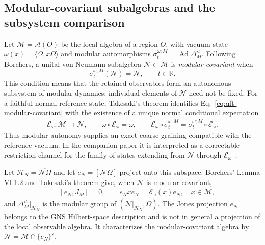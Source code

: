 \documentclass[a4paper,11pt]{article}
\theoremstyle{definition}
\begin{document}
\subsection{Modular-covariant subalgebras and the subsystem comparison}
\label{subsec:qft-modular-covariant}
Let $\mathcal M=\mathcal A(O)$ be the local algebra of a region $O$,
with vacuum state $\omega(x)=\langle\Omega,x\Omega\rangle$ and modular
automorphisms $\sigma_t^{\omega;M}=\operatorname{Ad}\Delta_M^{it}$.
Following Borchers, a unital von Neumann subalgebra
$\mathcal N\subset\mathcal M$ is \emph{modular covariant} when
\begin{equation}
 \sigma_t^{\omega;M}(\mathcal N)=\mathcal N,
 \qquad t\in\mathbb R .
 \label{eq:qft-modular-covariant}
\end{equation}
This condition means that the retained observables form an autonomous
subsystem of modular dynamics; individual elements of $\mathcal N$ need
not be fixed. For a faithful normal reference state, Takesaki's theorem
identifies Eq.~\eqref{eq:qft-modular-covariant} with the existence of a
unique normal conditional expectation
\begin{align}
 \mathcal E_\omega:\mathcal M\longrightarrow\mathcal N,
 \qquad \omega\circ\mathcal E_\omega=\omega,
 \qquad
 \mathcal E_\omega\circ\sigma_t^{\omega;M}
   =\sigma_t^{\omega;M}\circ\mathcal E_\omega .
 \label{eq:qft-Takesaki-expectation}
\end{align}
Thus modular autonomy supplies an exact coarse-graining compatible
with the reference vacuum. In the companion paper it is interpreted as
a correctable restriction channel for the family of states extending
from $\mathcal N$ through $\mathcal E_\omega$~\cite{companion}.

Let $\mathcal H_N=\overline{\mathcal N\Omega}$ and let
$e_N=[\mathcal N\Omega]$ project onto this subspace. Borchers'
Lemma VI.1.2 and Takesaki's theorem give, when $\mathcal N$ is modular
covariant,
\begin{align}
 [e_N,\Delta_M^{it}]=[e_N,J_M]=0,
 \qquad
 e_Nxe_N=\mathcal E_\omega(x)e_N,
 \quad x\in\mathcal M,
 \label{eq:qft-Jones-compression}
\end{align}
and $\Delta_M^{it}|_{\mathcal H_N}$ is the modular group of
$(\mathcal N|_{\mathcal H_N},\Omega)$. The Jones projection $e_N$
belongs to the GNS Hilbert-space description and is not in general a
projection of the local observable algebra. It characterizes the
modular-covariant algebra by
$\mathcal N=\mathcal M\cap\{e_N\}'$.
\end{document}
